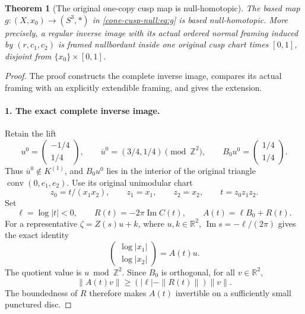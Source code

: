 \documentclass[11pt,letterpaper]{article}
\numberwithin{equation}{section}
\newtheorem{theorem}{Theorem}[section]
\theoremstyle{definition}
\theoremstyle{remark}
\begin{document}
\begin{theorem}[The original one-copy cusp map is null-homotopic]
\label{cone-cusp-null:thm}
The based map \(g:(X,x_0)\to(S^3,*)\) in \eqref{cone-cusp-null:eq:g} is based
null-homotopic. More precisely, a regular inverse image with its actual
ordered normal framing induced by \((r,c_1,c_2)\) is framed nullbordant
inside one original cusp chart times \([0,1]\), disjoint from
\(\{x_0\}\times[0,1]\).
\end{theorem}

\begin{proof}
The proof constructs the complete inverse image, compares its actual
framing with an explicitly extendible framing, and gives the extension.

\paragraph{1. The exact complete inverse image.}
Retain the lift
\[
 u^0=\begin{pmatrix}-1/4\\1/4\end{pmatrix},\qquad
 \overline u^0=(3/4,1/4)\pmod{\mathbb Z^2},\qquad
 B_0u^0=\begin{pmatrix}1/4\\1/4\end{pmatrix}.
\]
Thus \(\overline u^0\notin K^{(1)}\), and \(B_0u^0\) lies in the
interior of the original triangle \(\operatorname{conv}(0,e_1,e_2)\).
Use its original unimodular chart
\begin{equation}
 z_0=t/(x_1x_2),\qquad z_1=x_1,\qquad z_2=x_2,
 \qquad t=z_0z_1z_2.
 \label{cone-cusp-null:eq:chart}
\end{equation}
Set
\[
 \ell=\log|t|<0,\qquad R(t)=-2\pi\operatorname{Im}C(t),\qquad
 A(t)=\ell B_0+R(t).
\]
For a representative \(\zeta=Z(s)u+k\), where \(u,k\in\mathbb R^2\),
\(\operatorname{Im}s=-\ell/(2\pi)\) gives the exact identity
\begin{equation}
 \begin{pmatrix}\log|x_1|\\\log|x_2|\end{pmatrix}
 =A(t)u.
 \label{cone-cusp-null:eq:moduli}
\end{equation}
The quotient value is \(u\bmod\mathbb Z^2\).
Since \(B_0\) is orthogonal, for all \(v\in\mathbb R^2\),
\begin{equation}
 \|A(t)v\|\geq (|\ell|-\|R(t)\|)\|v\|.
 \label{cone-cusp-null:eq:invertibility}
\end{equation}
The boundedness of \(R\) therefore makes \(A(t)\) invertible on a
sufficiently small punctured disc.


\end{proof}
\end{document}
